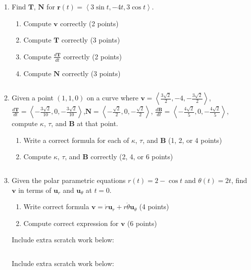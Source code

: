 \documentclass[12pt]{article}
\newcommand{\up}{$~$\vspace*{-0.7in}}
\newcommand{\liner}{\noindent\underline{\hspace*{7in}}}
\renewcommand{\vec}{\mathbf}
\newcommand{\<}{\left<}
\renewcommand{\>}{\right>}
\begin{document}
\begin{enumerate}



\item Find $\vec{T}$, $\vec{N}$ for $\vec{r}(t) = \left< 3\sin t, -4t, 3\cos t \right>$.

  \begin{enumerate}
    \item Compute $\vec{v}$ correctly (2 points)
    \item Compute $\vec{T}$ correctly (3 points)
    \item Compute $\frac{d\vec{T}}{dt}$ correctly (2 points)
    \item Compute $\vec{N}$ correctly (3 points)
  \end{enumerate}

\vspace*{8in}

\liner
\newpage\up


\item Given a point $(1,1,0)$ on a curve where $\vec{v}=\left< \frac{3\sqrt{2}}{2}, -4, -\frac{3\sqrt{2}}{2}\right>$, $\frac{d\vec{T}}{dt}=\left<-\frac{3\sqrt{2}}{10},0,-\frac{3\sqrt{2}}{10}\right>$,\newline $\vec{N}=\left<-\frac{\sqrt{2}}{2},0,-\frac{\sqrt{2}}{2}\right>$, $\frac{d\vec{B}}{dt}=\left<-\frac{4\sqrt{2}}{5},0,-\frac{4\sqrt{2}}{5}\right>$, compute $\kappa$, $\tau$, and $\vec{B}$ at that point.

  \begin{enumerate}
    \item Write a correct formula for each of $\kappa$, $\tau$, and $\vec{B}$ (1, 2, or 4 points)
    \item Compute $\kappa$, $\tau$, and $\vec{B}$ correctly (2, 4, or 6 points)
  \end{enumerate}

\vspace*{8in}

\liner

\newpage\up

\item Given the polar parametric equations $r(t)=2-\cos t$ and $\theta(t)=2t$, find $\vec{v}$ in terms of $\vec{u}_r$ and $\vec{u}_\theta$ at $t=0$.

  \begin{enumerate}
    \item Write correct formula $\vec{v} = \dot{r}\vec{u}_r + r\dot\theta\vec{u}_\theta$ (4 points)
    \item Compute correct expression for $\vec{v}$ (6 points)
  \end{enumerate}

\vspace*{8in}

\liner
\newpage

\centerline{Include extra scratch work below:}
\liner
\newpage\up

\centerline{Include extra scratch work below:}
\liner

\end{enumerate}
\end{document}
